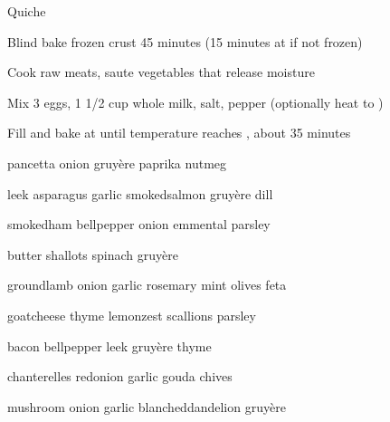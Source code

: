 \begin{densecard}{Quiche}{}
\begin{densesteps}
    \item Blind bake frozen crust 45 minutes (15 minutes at  if not frozen)
    \item Cook raw meats, saute vegetables that release moisture
    \item Mix 3 eggs, 1 1/2 cup whole milk, salt, pepper (optionally heat to )
    \item Fill and bake at  until temperature reaches , about 35 minutes
\end{densesteps}
\begin{paracol}{3}
 pancetta onion gruyère paprika nutmeg

 leek asparagus garlic smoked\ijoin{}salmon gruyère dill

 smoked\ijoin{}ham bell\ijoin{}pepper onion emmental parsley

\nextcolumn

 butter shallots spinach gruyère

 ground\ijoin{}lamb onion garlic rosemary mint olives feta

 goat\ijoin{}cheese thyme lemon\ijoin{}zest scallions parsley

\nextcolumn
{} bacon bell\ijoin{}pepper leek gruyère thyme

 chanterelles red\ijoin{}onion garlic gouda chives

 mushroom onion garlic blanched\ijoin{}dandelion gruyère
\end{paracol}
\end{densecard}

